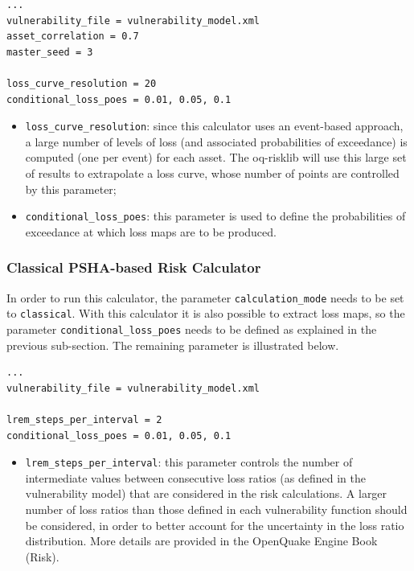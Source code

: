\begin{Verbatim}[frame=single, commandchars=\\\{\}, samepage=true]
...
vulnerability_file = vulnerability_model.xml
asset_correlation = 0.7
master_seed = 3

loss_curve_resolution = 20
conditional_loss_poes = 0.01, 0.05, 0.1
\end{Verbatim}

\begin{itemize}
\item  \Verb+loss_curve_resolution+: since this calculator uses an event-based approach, a large number of levels of loss (and associated probabilities of exceedance) is computed (one per event) for each asset. The oq-risklib will use this large set of results to extrapolate a loss curve, whose number of points are controlled by this parameter;
\item  \Verb+conditional_loss_poes+: this parameter is used to define the probabilities of exceedance at which loss maps are to be produced.
\end{itemize}

\subsubsection{Classical PSHA-based Risk Calculator}
In order to run this calculator, the parameter \Verb+calculation_mode+ needs to be set to \Verb+classical+. With this calculator it is also possible to extract loss maps, so the parameter \Verb+conditional_loss_poes+ needs to be defined as explained in the previous sub-section. The remaining parameter is illustrated below.
\begin{Verbatim}[frame=single, commandchars=\\\{\}, samepage=true]
...
vulnerability_file = vulnerability_model.xml

lrem_steps_per_interval = 2
conditional_loss_poes = 0.01, 0.05, 0.1
\end{Verbatim}

\begin{itemize}
\item  \Verb+lrem_steps_per_interval+: this parameter controls the number of intermediate values between consecutive loss ratios (as defined in the \gls{vulnerability model}) that are considered in the risk calculations. A larger number of loss ratios than those defined in each \gls{vulnerability function} should be considered, in order to better account for the uncertainty in the loss ratio distribution. More details are provided in the OpenQuake Engine Book (Risk).  
\end{itemize}

